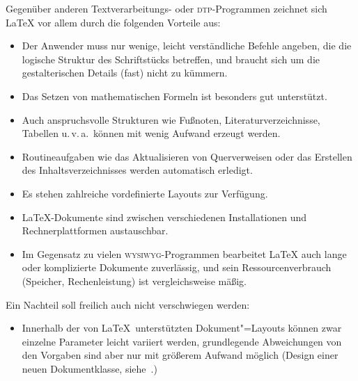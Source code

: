 Gegenüber anderen Textverarbeitungs- oder \textsc{dtp}-Programmen 
zeichnet sich \LaTeX{}
vor allem durch die folgenden Vorteile aus:
\begin{itemize}
\item Der Anwender muss nur wenige, leicht verständliche Befehle
  angeben, die die logische Struktur des Schriftstücks
  betreffen, und braucht sich um die gestalterischen Details
  (fast) nicht zu kümmern.
\item Das Setzen von mathematischen Formeln ist besonders gut
  unterstützt.
\item Auch anspruchsvolle Strukturen wie Fußnoten, Literaturverzeichnisse,
  Tabellen u.\,v.\,a.\  können mit wenig Aufwand erzeugt werden.
\item Routineaufgaben wie das Aktualisieren von Querverweisen
 oder das Erstellen des Inhaltsverzeichnisses 
 werden automatisch erledigt.
\item Es stehen zahlreiche vordefinierte Layouts zur Verfügung.
\item \LaTeX-Dokumente sind zwischen verschiedenen Installationen und
 Rechnerplattformen austauschbar.
\item Im Gegensatz zu vielen \textsc{wysiwyg}-Programmen bearbeitet \LaTeX{} auch
  lange oder komplizierte Dokumente zuverlässig,
  und sein Ressourcenverbrauch (Speicher, Rechenleistung) ist vergleichsweise
  mäßig.
\end{itemize}
Ein Nachteil soll freilich auch nicht verschwiegen werden:
\begin{itemize}
\item Innerhalb der von \LaTeX\ unterstützten Dokument"=Layouts
  können zwar einzelne Parameter leicht variiert werden,
  grundlegende Abweichungen von den Vorgaben sind
  aber nur mit größerem Aufwand möglich (Design einer
  neuen Dokumentklasse, siehe~\cite{clsguide,lay,lay2,typografie}.)
\end{itemize}

